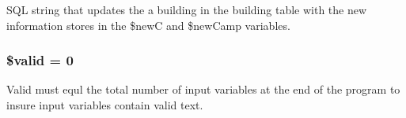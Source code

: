 \-S\-Q\-L string that updates the a building in the building table with the new information stores in the \$new\-C and \$new\-Camp variables. \hypertarget{upComplex_8php_a0587674d27d00ef497e08e53ccf45bbb}{
\subsubsection[{\$valid}]{\setlength{\rightskip}{0pt plus 5cm}\$valid = 0}}\label{upComplex_8php_a0587674d27d00ef497e08e53ccf45bbb}
\-Valid must equl the total number of input variables at the end of the program to insure input variables contain valid text. 
